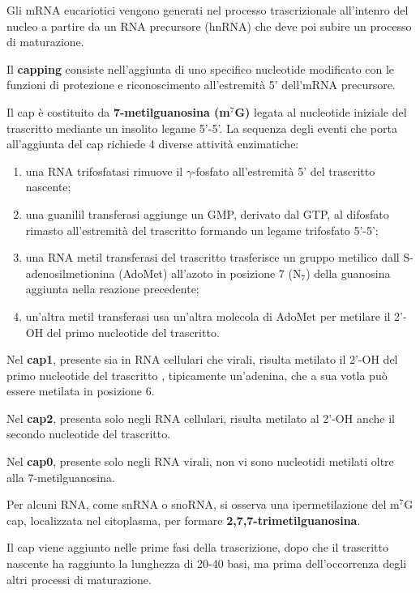 \documentclass[]{article}
\begin{document}
Gli mRNA eucariotici vengono generati nel processo trascrizionale
all'intenro del nucleo a partire da un RNA precursore (hnRNA) che deve
poi subire un processo di maturazione.

Il \textbf{capping} consiste nell'aggiunta di uno specifico nucleotide
modificato con le funzioni di protezione e riconoscimento all'estremità
5' dell'mRNA precursore.

Il cap è costituito da \textbf{7-metilguanosina (m\(^7\)G)} legata al
nucleotide iniziale del trascritto mediante un insolito legame 5'-5'. La
sequenza degli eventi che porta all'aggiunta del cap richiede 4 diverse
attività enzimatiche:

\begin{enumerate}
\def\labelenumi{\arabic{enumi}.}
\itemsep1pt\parskip0pt
\item
  una RNA trifosfatasi rimuove il \(\gamma\)-fosfato all'estremità 5'
  del trascritto nascente;
\item
  una guanilil transferasi aggiunge un GMP, derivato dal GTP, al
  difosfato rimasto all'estremità del trascritto formando un legame
  trifosfato 5'-5';
\item
  una RNA metil transferasi del trascritto trasferisce un gruppo
  metilico dall S-adenosilmetionina (AdoMet) all'azoto in posizione 7
  (N\(_7\)) della guanosina aggiunta nella reazione precedente;
\item
  un'altra metil transferasi usa un'altra molecola di AdoMet per
  metilare il 2'-OH del primo nucleotide del trascritto.
\end{enumerate}

Nel \textbf{cap1}, presente sia in RNA cellulari che virali, risulta
metilato il 2'-OH del primo nucleotide del trascritto , tipicamente
un'adenina, che a sua votla può essere metilata in posizione 6.

Nel \textbf{cap2}, presenta solo negli RNA cellulari, risulta metilato
al 2'-OH anche il secondo nucleotide del trascritto.

Nel \textbf{cap0}, presente solo negli RNA virali, non vi sono
nucleotidi metilati oltre alla 7-metilguanosina.

Per alcuni RNA, come snRNA o snoRNA, si osserva una ipermetilazione del
m\(^7\)G cap, localizzata nel citoplasma, per formare
\textbf{2,7,7-trimetilguanosina}.

Il cap viene aggiunto nelle prime fasi della trascrizione, dopo che il
trascritto nascente ha raggiunto la lunghezza di 20-40 basi, ma prima
dell'occorrenza degli altri processi di maturazione.
\end{document}
